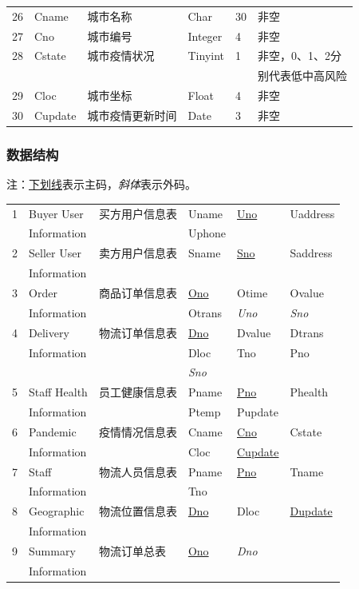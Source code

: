 \documentclass[12pt]{article}
\begin{document}
\begin{center}
\begin{supertabular}{llllll}
	26 &	Cname &	城市名称 &	Char &	30 	& 非空 \\
	27 &	Cno &	城市编号 &	Integer &	4 &	非空 \\
	28 &	Cstate &	城市疫情状况 &	Tinyint &	1 &	 非空，0、1、2分\\ &&&&& 别代表低中高风险 \\
	29 &	Cloc &	城市坐标 &	Float &	4 &	非空 \\
	30 &	Cupdate &	城市疫情更新时间 &	Date &	3 &	非空 \\
\end{supertabular}
\end{center}

\subsubsection{数据结构}

注：\underline{下划线}表示主码，\textit{斜体}表示外码。

\tabletail{\bottomrule}

\begin{center}
\begin{supertabular}{llllll}
1 &	Buyer User &	买方用户信息表 & Uname &	\underline{Uno} &	Uaddress  \\ & Information &&	Uphone && \\
2 &	Seller User &	卖方用户信息表 & Sname &	\underline{Sno} &	Saddress \\ & Information &&&& \\
3 &	Order  & 商品订单信息表 &	\underline{Ono} &	Otime &	Ovalue  \\
& Information &&	Otrans & \textit{Uno} &	\textit{Sno}  \\
4 &	Delivery &	物流订单信息表 &	\underline{Dno} &	Dvalue &	Dtrans  \\ & Information && Dloc & Tno &	Pno \\&&& \textit{Sno} &&	  \\ 	
5 &	Staff Health &	员工健康信息表 &	Pname &	\underline{Pno} &	Phealth  \\ 
& Information &&	Ptemp & Pupdate & \\
6 &	Pandemic &	疫情情况信息表 &	Cname &	\underline{Cno} &	Cstate \\	& Information &&  Cloc & \underline{Cupdate}	& \\
7 &Staff  &	物流人员信息表 &	Pname &	\underline{Pno} &	Tname \\ & Information	& & Tno && \\
8 &	Geographic  &	物流位置信息表 &	\underline{Dno} &	Dloc &	\underline{Dupdate} \\& Information&&&& \\
9 & Summary & 物流订单总表 & \underline{Ono} & \textit{Dno} & \\ & Information &&&& \\
\end{supertabular}
\end{center}
\end{document}
